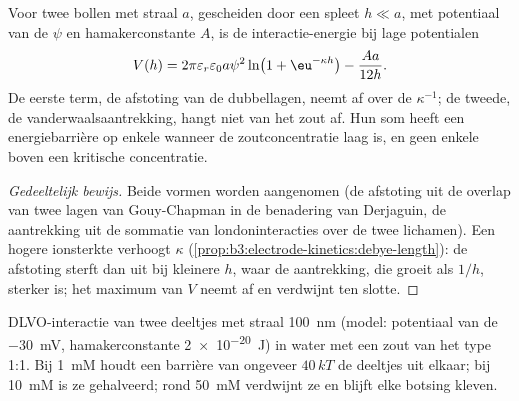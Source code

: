 \begin{theorem}\label{thm:b3:colloids:dlvo}
Voor twee bollen met straal $a$, gescheiden door een spleet $h \ll a$, met
potentiaal van de 
$\psi$ en hamakerconstante $A$, is de interactie-energie bij lage
potentialen
\[
  V(h) = 2\pi\varepsilon_r\varepsilon_0a\psi^2\ln\bigl(1 + \eu^{-\kappa h}\bigr) - \frac{Aa}{12h} .
\]
De eerste term, de afstoting van de dubbellagen, neemt af over de  $\kappa^{-1}$;
de tweede, de vanderwaalsaantrekking, hangt niet van het zout af. Hun som
heeft een energiebarrière op enkele  wanneer de
zoutconcentratie laag is, en geen enkele boven een kritische
concentratie.
\end{theorem}

\begin{proof}[Gedeeltelijk bewijs]
Beide vormen worden aangenomen (de afstoting uit de overlap van twee lagen
van Gouy-Chapman in de benadering van Derjaguin, de aantrekking uit de
sommatie van londoninteracties over de twee lichamen). Een hogere
ionsterkte verhoogt $\kappa$
(\cref{prop:b3:electrode-kinetics:debye-length}): de afstoting sterft dan
uit bij kleinere $h$, waar de aantrekking, die groeit als $1/h$, sterker is; het maximum
van $V$ neemt af en verdwijnt ten slotte.
\end{proof}

\begin{omfigure}

{\small DLVO-interactie van twee deeltjes met straal \qty{100}{nm} (model:
potentiaal van de 
\qty{-30}{mV}, hamakerconstante \qty{2e-20}{J}) in water met een zout van het type 1:1. Bij \qty{1}{mM}
houdt een barrière van ongeveer $40\,kT$ de deeltjes uit elkaar; bij \qty{10}{mM} is ze gehalveerd;
rond \qty{50}{mM} verdwijnt ze en blijft elke botsing kleven.}
\end{omfigure}

